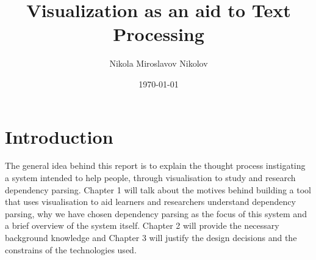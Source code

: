 \documentclass[bsc,frontabs,twoside,singlespacing,parskip,deptrepor]{infthesis}
\begin{document}
\title{Visualization as an aid to Text Processing}

\author{Nikola Miroslavov Nikolov}



\date{\today}


\maketitle


\tableofcontents



\chapter{Introduction}

The general idea behind this report is to explain the thought process instigating a system intended to help people, through visualisation to study and research dependency parsing. Chapter 1 will talk about the motives behind building a tool that uses visualisation to aid learners and researchers understand dependency parsing, why we have chosen dependency parsing as the focus of this system and a brief overview of the system itself. Chapter 2 will provide the necessary background knowledge and Chapter 3 will justify the design decisions and the constrains of the technologies used.
\end{document}
